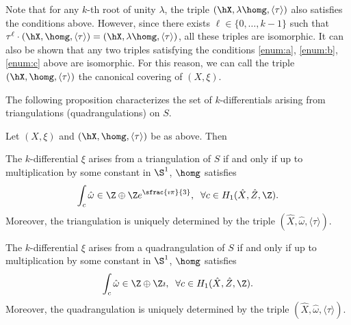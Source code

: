 Note that for any $k$-th root of unity $\lambda$, the triple $(\hX, \lambda\homg,\langle \tau\rangle)$ also satisfies the conditions above. However, since there exists $\ell \in \{0,\dots,k-1\}$ such that $\tau^\ell\cdot(\hX,\homg,\langle \tau\rangle)=(\hX, \lambda\homg,\langle \tau\rangle)$, all these triples are isomorphic. It can also be shown that any two triples satisfying the conditions \eqref{enum:a}, \eqref{enum:b}, \eqref{enum:c} above are isomorphic.
For this reason, we can call the triple $(\hX,\homg,\langle\tau\rangle)$ the canonical covering of $(X,\xi)$.

The following proposition characterizes the set of $k$-differentials arising from triangulations (\resp quadrangulations) on $S$.
\begin{Proposition}\label{prop:reg:tiled:surface}
Let $(X,\xi)$ and $(\hX,\homg,\langle \tau \rangle)$ be as above. Then
\begin{enumeratei}
\item
The $k$-differential $\xi$ arises from a triangulation of $S$ if and only if up to multiplication by some constant in $\S^1$, $\homg$ satisfies
\begin{equation}\label{eq:cond:kdiff:triang}
\int_c\hat{\omega} \in \Z\oplus\Z e^{\sfrac{\imath\pi}{3}}, \; \; \forall c\in H_1(\hat{X},\hat{Z},\Z).
\end{equation}
Moreover, the triangulation is uniquely determined by the triple $(\hat{X},\hat{\omega},\langle\tau\rangle)$.

\item
The $k$-differential $\xi$ arises from a quadrangulation of $S$ if and only if up to multiplication by some constant in $\S^1$, $\homg$ satisfies
\begin{equation}\label{eq:cond:kdiff:quad}
\int_c\hat{\omega} \in \Z\oplus\Z\imath, \; \; \forall c\in H_1(\hat{X},\hat{Z},\Z).
\end{equation}
Moreover, the quadrangulation is uniquely determined by the triple $(\hat{X},\hat{\omega},\langle\tau\rangle)$.
\end{enumeratei}
\end{Proposition}
